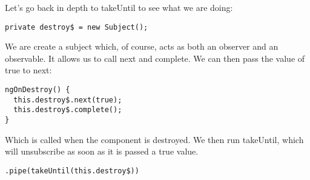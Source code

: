 Let's go back in depth to takeUntil to see what we are doing:
\begin{verbatim}
private destroy$ = new Subject();
\end{verbatim}
We are create a subject which, of course, acts as both an observer and an
observable. It allows us to call next and complete. We can then pass the value
of true to next:

\begin{verbatim}
ngOnDestroy() {
  this.destroy$.next(true);
  this.destroy$.complete();
}
\end{verbatim}
Which is called when the component is destroyed. We then run takeUntil, which
will unsubscribe as soon as it is passed a true value.
\begin{verbatim}
.pipe(takeUntil(this.destroy$))
\end{verbatim}
